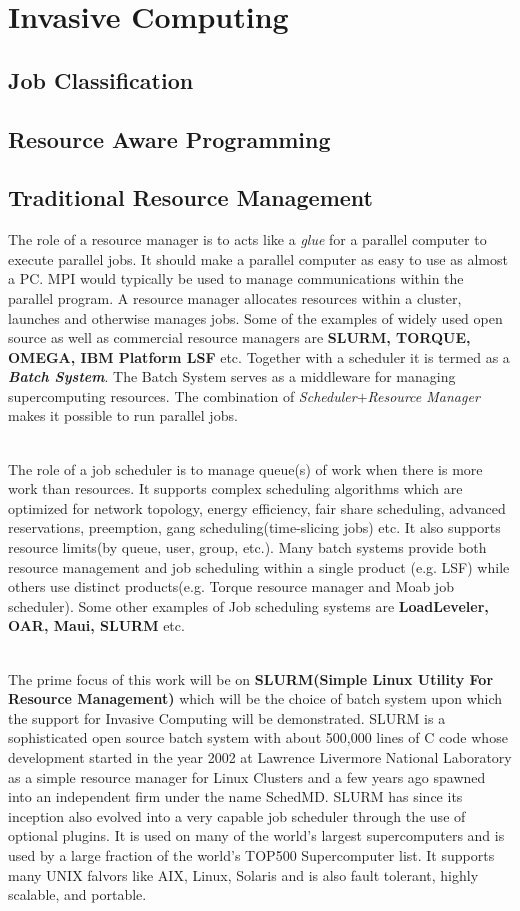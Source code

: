 \chapter{Invasive Computing}\label{chapter:invasive computing}
\section{Job Classification}
\section{Resource Aware Programming}

\section{Traditional Resource Management}
The role of a resource manager is to acts like a \textit{glue} for a parallel computer to execute parallel jobs. It should make a parallel computer as easy to use as almost a PC. MPI would typically be used to manage communications within the parallel program. A resource manager allocates resources within a cluster, launches and otherwise manages jobs. Some of the examples of widely used open source as well as commercial resource managers are \textbf{SLURM, TORQUE, OMEGA, IBM Platform LSF} etc. Together with a scheduler it is termed as a \textbf{\textit{Batch System}}. The Batch System serves as a middleware for managing supercomputing resources. The combination of \textit{Scheduler}$+$\textit{Resource Manager} makes it possible to run parallel jobs.\par
\noindent
\\
The role of a job scheduler is to manage queue(s) of work when there is more work than resources. It supports complex scheduling algorithms which are optimized for network topology, energy efficiency, fair share scheduling, advanced reservations, preemption, gang scheduling(time-slicing jobs) etc. It also supports resource limits(by queue, user, group, etc.). Many batch systems provide both resource management and job scheduling within a single product (e.g. LSF) while others use distinct products(e.g. Torque resource manager and Moab job scheduler). Some other examples of Job scheduling systems are \textbf{LoadLeveler, OAR, Maui, SLURM} etc.\par
\noindent
\\
The prime focus of this work will be on \textbf{SLURM(Simple Linux Utility For Resource Management)} which will be the choice of batch system upon which the support for Invasive Computing will be demonstrated. SLURM is a sophisticated open source batch system with about 500,000 lines of C code whose development started in the year 2002 at Lawrence Livermore National Laboratory as a simple resource manager for Linux Clusters and a few years ago spawned into an independent firm under the name SchedMD. SLURM has since its inception also evolved into a very capable job scheduler through the use of optional plugins. It is used on many of the world's largest supercomputers and is used by a large fraction of the world's TOP500 Supercomputer list. It supports many UNIX falvors like AIX, Linux, Solaris and is also fault tolerant, highly scalable, and portable.\par
